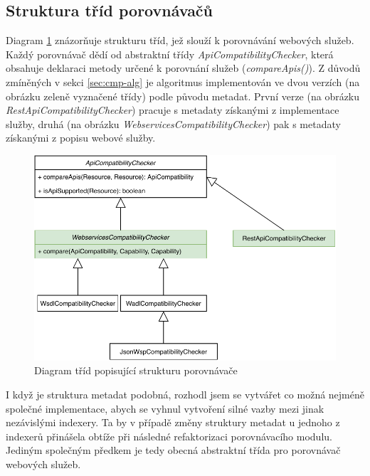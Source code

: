 \documentclass[czech,DP]{thesiskiv}
\begin{document}
\subsection{Struktura tříd porovnávačů}

Diagram \ref{fig:cmp-uml-class} znázorňuje strukturu tříd, jež slouží k porovnávání webových služeb. Každý porovnávač dědí od abstraktní třídy \textit{ApiCompatibilityChecker}, která obsahuje deklaraci metody určené k porovnání služeb (\textit{compareApis()}). Z důvodů zmíněných v sekci \ref{sec:cmp-alg} je algoritmus implementován ve dvou verzích (na obrázku zeleně vyznačené třídy) podle původu metadat. První verze (na obrázku \textit{RestApiCompatibilityChecker}) pracuje s metadaty získanými z implementace služby, druhá (na obrázku \textit{WebservicesCompatibilityChecker}) pak s metadaty získanými z popisu webové služby.


\begin{figure}[h]
	\centering
		\includegraphics[width=\linewidth]{cmp-uml-class}
	\caption{Diagram tříd popisující strukturu porovnávače}
	\label{fig:cmp-uml-class}
\end{figure}

I když je struktura metadat podobná, rozhodl jsem se vytvářet co možná nejméně společné implementace, abych se vyhnul vytvoření silné vazby mezi jinak nezávislými indexery. Ta by v případě změny struktury metadat u jednoho z indexerů přinášela obtíže při následné refaktorizaci porovnávacího modulu. Jediným společným předkem je tedy obecná abstraktní třída pro porovnávač webových služeb.
\end{document}
